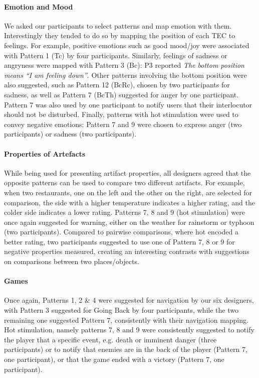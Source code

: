 \documentclass[preprint,12pt]{elsarticle}
\begin{document}
\paragraph{Emotion and Mood}
We asked our participants to select patterns and map emotion with them.
Interestingly they tended to do so by mapping the position of each TEC to feelings.
For example, positive emotions such as good mood/joy were associated with Pattern 1 (Tc) by four participants.
Similarly, feelings of sadness or angryness were mapped with Pattern 3 (Bc): P3 reported \textit{The bottom position means ``I am feeling down''}.
Other patterns involving the bottom position were also suggested, such as Pattern 12 (BcRc), chosen by two participants for sadness, as well as Pattern 7 (BcTh) suggested for anger by one participant.
Pattern 7 was also used by one participant to notify users that their interlocutor should not be disturbed.
Finally, patterns with hot stimulation were used to convey negative emotions: Pattern 7 and 9 were chosen to express anger (two participants) or sadness (two participants).

\paragraph{Properties of Artefacts}
While being used for presenting artifact properties, all designers agreed that the opposite patterns can be used to compare two different artifacts.
For example, when two restaurants, one on the left and the other on the right, are selected for comparison, the side with a higher temperature indicates a higher rating, and the colder side indicates a lower rating.
Patterns 7, 8 and 9 (hot stimulation) were once again suggested for warning, either on the weather for rainstorm or typhoon (two participants).
Compared to pairwise comparisons, where hot encoded a better rating, two participants suggested to use one of Pattern 7, 8 or 9 for negative properties measured, creating an interesting contrasts with suggestions on comparisons between two places/objects.

\paragraph{Games}
Once again, Patterns 1, 2 \& 4 were suggested for navigation by our six designers, with Pattern 3 suggested for Going Back by four participants, while the two remaining one suggested Pattern 7, consistently with their navigation mapping.
Hot stimulation, namely patterns 7, 8 and 9 were consistently suggested to notify the player that a specific event, e.g. death or imminent danger (three participants) or to notify that enemies are in the back of the player (Pattern 7, one participant), or that the game ended with a victory (Pattern 7, one participant).
\end{document}
